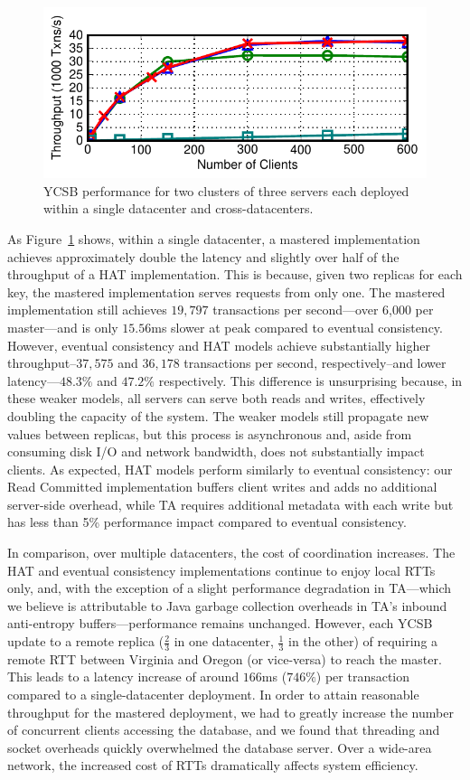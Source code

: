 \begin{figure}[t!]
\includegraphics[width=0.90\columnwidth]{figs/wan-threads-thru.pdf}
\caption{YCSB performance for two clusters of three servers each
  deployed within a single datacenter and cross-datacenters.}
\label{fig:wan-exp}
\end{figure}

As Figure~\ref{fig:wan-exp} shows, within a single datacenter, a
mastered implementation achieves approximately double the latency and
slightly over half of the throughput of a HAT implementation. This is
because, given two replicas for each key, the mastered implementation
serves requests from only one. The mastered implementation still
achieves $19,797$ transactions per second---over 6,000 per
master---and is only $15.56$ms slower at peak compared to eventual
consistency. However, eventual consistency and HAT models achieve
substantially higher throughput--$37,575$ and $36,178$ transactions
per second, respectively--and lower latency---$48.3\%$ and $47.2\%$
respectively. This difference is unsurprising because, in these weaker
models, all servers can serve both reads and writes, effectively
doubling the capacity of the system. The weaker models still propagate
new values between replicas, but this process is asynchronous and,
aside from consuming disk I/O and network bandwidth, does not
substantially impact clients. As expected, HAT models perform
similarly to eventual consistency: our Read Committed implementation
buffers client writes and adds no additional server-side overhead,
while TA requires additional metadata with each write but has less
than 5\% performance impact compared to eventual consistency.

In comparison, over multiple datacenters, the cost of coordination
increases. The HAT and eventual consistency implementations continue
to enjoy local RTTs only, and, with the exception of a slight
performance degradation in TA---which we believe is attributable to
Java garbage collection overheads in TA's inbound anti-entropy
buffers---performance remains unchanged. However, each YCSB update to
a remote replica ($\frac{2}{3}$ in one datacenter, $\frac{1}{3}$ in
the other) of requiring a remote RTT between Virginia and Oregon (or
vice-versa) to reach the master. This leads to a latency increase of
around $166$ms ($746\%$) per transaction compared to a
single-datacenter deployment. In order to attain reasonable throughput
for the mastered deployment, we had to greatly increase the number of
concurrent clients accessing the database, and we found that threading
and socket overheads quickly overwhelmed the database server. Over a
wide-area network, the increased cost of RTTs dramatically affects
system efficiency.

